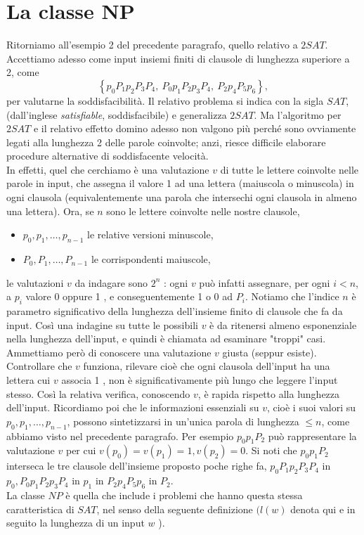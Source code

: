 \section{La classe NP}

Ritorniamo all'esempio 2 del precedente paragrafo, quello relativo a $2 S A T$.
Accettiamo adesso come input insiemi finiti di clausole di lunghezza superiore a
2, come
$$
    \left\{p_0 P_1 p_2 P_3 P_4, \ P_0 p_1 P_2 p_3 P_4, \ P_2 p_4 P_5 p_6\right\},
$$
per valutarne la soddisfacibilità. Il relativo problema si indica con la sigla
$S A T$, (dall'inglese \textit{satisfiable}, soddisfacibile) e generalizza $2 S A T$. Ma
l'algoritmo per $2 S A T$ e il relativo effetto domino adesso non valgono più
perché sono ovviamente legati alla lunghezza 2 delle parole coinvolte; anzi,
riesce difficile elaborare procedure alternative di soddisfacente velocità.\\
In effetti, quel che cerchiamo è una valutazione $v$ di tutte le lettere coinvolte
nelle parole in input, che assegna il valore 1 ad una lettera (maiuscola o
minuscola) in ogni clausola (equivalentemente una parola che intersechi ogni
clausola in almeno una lettera). Ora, se $n$ sono le lettere coinvolte nelle
nostre clausole,

\begin{itemize}
    \item $p_0, p_1, \ldots, p_{n-1}$ le relative versioni minuscole,
    \item $P_0, P_1, \ldots, P_{n-1}$ le corrispondenti maiuscole,
\end{itemize}

le valutazioni $v$ da
indagare sono $2^n$ : ogni $v$ può infatti assegnare, per ogni $i<n$, a $p_i$
valore 0 oppure 1 , e conseguentemente 1 o 0 ad $P_i$. Notiamo che l'indice $n$
è parametro significativo della lunghezza dell'insieme finito di clausole che fa
da input. Così una indagine su tutte le possibili $v$ è da ritenersi almeno
esponenziale nella lunghezza dell'input, e quindi è chiamata ad esaminare
"troppi" casi. Ammettiamo però di conoscere una valutazione $v$ giusta (seppur
esiste). Controllare che $v$ funziona, rilevare cioè che ogni clausola
dell'input ha una lettera cui $v$ associa 1 , non è significativamente più lungo
che leggere l'input stesso. Così la relativa verifica, conoscendo $v$, è rapida
rispetto alla lunghezza dell'input. Ricordiamo poi che le informazioni
essenziali su $v$, cioè i suoi valori su $p_0, p_1, \ldots, p_{n-1}$, possono
sintetizzarsi in un'unica parola di lunghezza $\leq n$, come abbiamo visto nel
precedente paragrafo. Per esempio $p_0 p_1 P_2$ può rappresentare la valutazione
$v$ per cui $v\left(p_0\right)=v\left(p_1\right)=1, v\left(p_2\right)=0$. Si
noti che $p_0 p_1 P_2$ interseca le tre clausole dell'insieme proposto poche
righe fa, $p_0 P_1 p_2 P_3 P_4$ in $p_0, P_0 p_1 P_2 p_3 P_4$ in $p_1$ in $P_2
    p_4 P_5 p_6$ in $P_2$.\\
La classe $N P$ è quella che include i problemi che hanno
questa stessa caratteristica di $S A T$, nel senso della seguente definizione
$(l(w)$ denota qui e in seguito la lunghezza di un input $w$ ).

